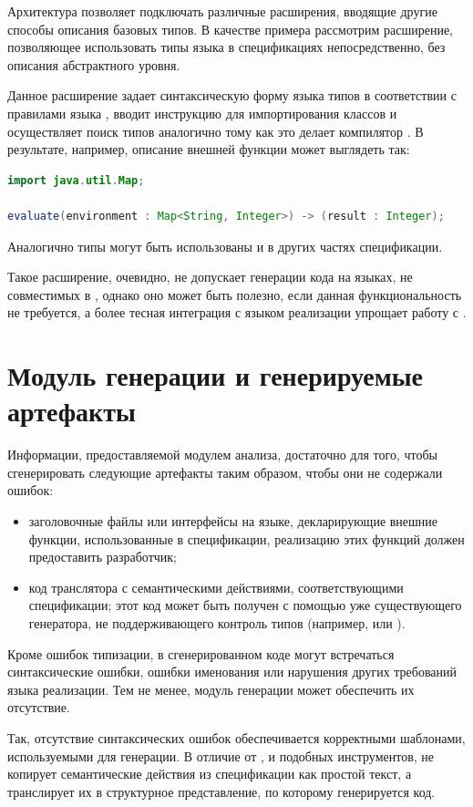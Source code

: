 Архитектура \ATF{} позволяет подключать различные расширения, вводящие другие способы описания базовых типов. В качестве примера рассмотрим расширение, позволяющее использовать типы языка  в спецификациях \ATF{} непосредственно, без описания абстрактного уровня.

Данное расширение задает синтаксическую форму языка типов в соответствии с правилами языка , вводит инструкцию  для импортирования классов и осуществляет поиск типов аналогично тому как это делает компилятор . В результате, например, описание внешней функции может выглядеть так:
\begin{lstlisting}[language=Java]
import java.util.Map;

evaluate(environment : Map<String, Integer>) -> (result : Integer);
\end{lstlisting}
Аналогично типы могут быть использованы и в других частях спецификации.

Такое расширение, очевидно, не допускает генерации кода на языках, не совместимых в , однако оно может быть полезно, если данная функциональность не требуется, а более тесная интеграция с языком реализации упрощает работу с \ATF{}.

\section{Модуль генерации и генерируемые артефакты}

Информации, предоставляемой модулем анализа, достаточно для того, чтобы сгенерировать следующие артефакты таким образом, чтобы они не содержали ошибок:
\begin{itemize}
\item заголовочные файлы или интерфейсы на языке, декларирующие внешние функции, использованные в спецификации, реализацию этих функций должен предоставить разработчик;
\item код транслятора с семантическими действиями, соответствующими спецификации; этот код может быть получен с помощью уже существующего генератора, не поддерживающего контроль типов (например,  или ).
\end{itemize}

Кроме ошибок типизации, в сгенерированном коде могут встречаться синтаксические ошибки, ошибки именования или нарушения других требований языка реализации. Тем не менее, модуль генерации может обеспечить их отсутствие. 

Так, отсутствие синтаксических ошибок обеспечивается корректными шаблонами, используемыми для генерации. В отличие от ,  и подобных инструментов, \ATF{} не копирует семантические действия из спецификации как простой текст, а транслирует их в структурное представление, по которому генерируется код.

